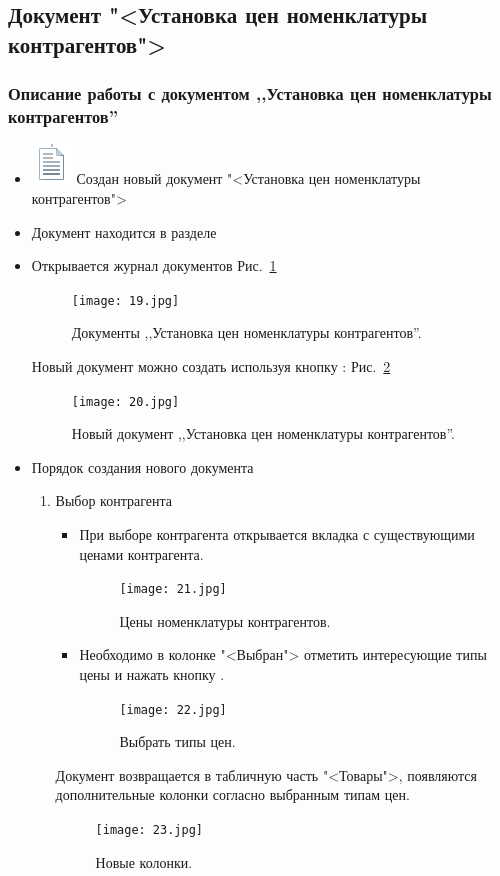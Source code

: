 \subsection{Документ "<Установка цен номенклатуры контрагентов">}
\subsubsection{Описание работы с документом ,,Установка цен номенклатуры контрагентов''}
\begin{itemize}	
	 \item \includegraphics[width=0.02\linewidth]{images/doc} Создан новый документ "<Установка цен номенклатуры контрагентов">      	
	\item Документ находится в разделе 
	\item Открывается журнал документов
	Рис.~\ref{ris:19.jpg}	
\begin{figure}[H]
	\texttt{[image: 19.jpg]}
	\caption{Документы ,,Установка цен номенклатуры контрагентов''.}
	\label{ris:19.jpg}
\end{figure}
	Новый документ можно создать используя кнопку :
	Рис.~\ref{ris:20.jpg}	
\begin{figure}[H]
	\texttt{[image: 20.jpg]}
	\caption{Новый документ ,,Установка цен номенклатуры контрагентов''.}
	\label{ris:20.jpg}
\end{figure}
	\item Порядок создания нового документа
	\begin{enumerate}	
		\item Выбор контрагента
		\begin{itemize}		
				\item При выборе контрагента открывается вкладка с существующими ценами контрагента.
		\begin{figure}[H]
			\texttt{[image: 21.jpg]}
			\caption{Цены номенклатуры контрагентов.}
			\label{ris:21.jpg}
		\end{figure}		
			\item Необходимо в колонке "<Выбран"> отметить интересующие типы цены и нажать кнопку .
		\begin{figure}[H]
			\texttt{[image: 22.jpg]}
			\caption{Выбрать типы цен.}
			\label{ris:22.jpg}
		\end{figure}		
		\end{itemize}	
		Документ возвращается в табличную часть "<Товары">, появляются дополнительные колонки согласно выбранным типам цен.
		\begin{figure}[H]
			\texttt{[image: 23.jpg]}
			\caption{Новые колонки.}
			\label{ris:23.jpg}
		\end{figure}		
		

\end{enumerate}
\end{itemize}
